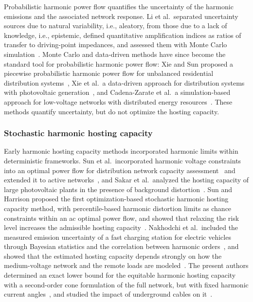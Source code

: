 Probabilistic harmonic power flow quantifies the uncertainty of the harmonic emissions and the associated network response. Li et al.\ separated uncertainty sources due to natural variability, i.e., aleatory, from those due to a lack of knowledge, i.e., epistemic, defined quantitative amplification indices as ratios of transfer to driving-point impedances, and assessed them with Monte Carlo simulation~\cite{li2020}. Monte Carlo and data-driven methods have since become the standard tool for probabilistic harmonic power flow: Xie and Sun proposed a piecewise probabilistic harmonic power flow for unbalanced residential distribution systems~\cite{xie_piecewise_2022}, Xie et al.\ a data-driven approach for distribution systems with photovoltaic generation~\cite{xie2022}, and Cadena-Zarate et al.\ a simulation-based approach for low-voltage networks with distributed energy resources~\cite{cadenazarate2024}. These methods quantify uncertainty, but do not optimize the hosting capacity.

\subsubsection{Stochastic harmonic hosting capacity}

Early harmonic hosting capacity methods incorporated harmonic limits within deterministic frameworks. Sun et al.\ incorporated harmonic voltage constraints into an optimal power flow for distribution network capacity assessment~\cite{sun_distribution_2012} and extended it to active networks~\cite{sun_incorporating_2012}, and Sakar et al.\ analyzed the hosting capacity of large photovoltaic plants in the presence of background distortion~\cite{sakar_integration_2018}. Sun and Harrison proposed the first optimization-based stochastic harmonic hosting capacity method, with percentile-based harmonic distortion limits as chance constraints within an ac optimal power flow, and showed that relaxing the risk level increases the admissible hosting capacity~\cite{sun_distribution_2022}. Nakhodchi et al.\ included the measured emission uncertainty of a fast charging station for electric vehicles through Bayesian statistics and the correlation between harmonic orders~\cite{nakhodchi2022}, and showed that the estimated hosting capacity depends strongly on how the medium-voltage network and the remote loads are modeled~\cite{nakhodchi_impact_2023}. The present authors determined an exact lower bound for the equitable harmonic hosting capacity with a second-order cone formulation of the full network, but with fixed harmonic current angles~\cite{vanacker_hosting_2026}, and studied the impact of underground cables on it~\cite{vanacker_impact_2025}.

